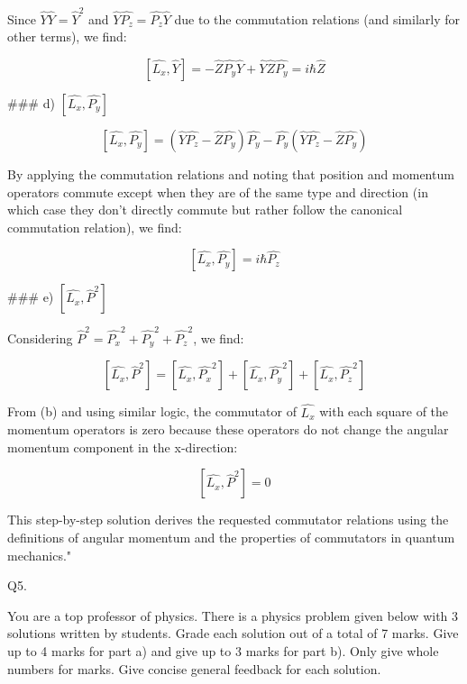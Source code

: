 Since \( \hat{Y} \hat{Y} = \hat{Y}^2 \) and \( \hat{Y} \hat{P_{z}} = \hat{P_{z}} \hat{Y} \) due to the commutation relations (and similarly for other terms), we find:

\[
\left[ \hat{L_{x}}, \hat{Y} \right] = -\hat{Z}\hat{P_{y}}\hat{Y} + \hat{Y}\hat{Z}\hat{P_{y}} = i\hbar\hat{Z}
\]

### d) \( \left[ \hat{L_{x}}, \hat{P_{y}} \right] \)

\[
\left[ \hat{L_{x}}, \hat{P_{y}} \right] = (\hat{Y}\hat{P_{z}} - \hat{Z}\hat{P_{y}})\hat{P_{y}} - \hat{P_{y}}(\hat{Y}\hat{P_{z}} - \hat{Z}\hat{P_{y}})
\]

By applying the commutation relations and noting that position and momentum operators commute except when they are of the same type and direction (in which case they don't directly commute but rather follow the canonical commutation relation), we find:

\[
\left[ \hat{L_{x}}, \hat{P_{y}} \right] = i\hbar\hat{P_{z}}
\]

### e) \( \left[ \hat{L_{x}}, \hat{P}^{2} \right] \)

Considering \( \hat{P}^{2} = \hat{P_{x}}^2 + \hat{P_{y}}^2 + \hat{P_{z}}^2 \), we find:

\[
\left[ \hat{L_{x}}, \hat{P}^{2} \right] = \left[ \hat{L_{x}}, \hat{P_{x}}^2 \right] + \left[ \hat{L_{x}}, \hat{P_{y}}^2 \right] + \left[ \hat{L_{x}}, \hat{P_{z}}^2 \right]
\]

From (b) and using similar logic, the commutator of \( \hat{L_{x}} \) with each square of the momentum operators is zero because these operators do not change the angular momentum component in the x-direction:

\[
\left[ \hat{L_{x}}, \hat{P}^{2} \right] = 0
\]

This step-by-step solution derives the requested commutator relations using the definitions of angular momentum and the properties of commutators in quantum mechanics."



                           Q5. 

You are a top professor of physics. There is a physics problem given below with 3 solutions written by students. Grade each solution out of a total of 7 marks. Give up to 4 marks for part a) and give up to 3 marks for part b). Only give whole numbers for marks. Give concise general feedback for each solution. 

